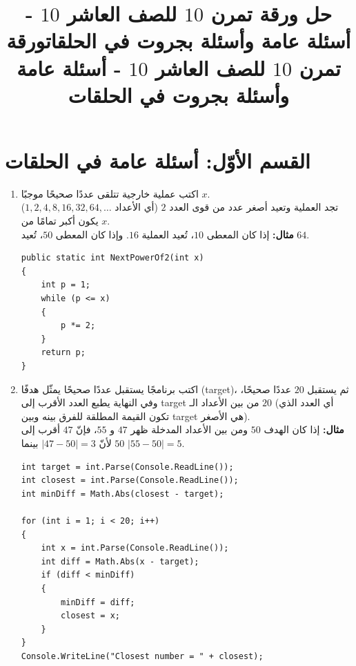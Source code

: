 \documentclass[14pt]{extarticle}
\title{حل ورقة تمرن $10$ للصف العاشر $10$ - أسئلة عامة وأسئلة بجروت في الحلقات}
\title{ورقة تمرن $10$ للصف العاشر $10$ - أسئلة عامة وأسئلة بجروت في الحلقات}
\begin{document}
\maketitle
\thispagestyle{fancy}

\section*{القسم الأوّل: أسئلة عامة في الحلقات}

\begin{enumerate}[itemsep=2em]

\item اكتب عملية خارجية تتلقى عددًا صحيحًا موجبًا $x$. \\
تجد العملية وتعيد أصغر عدد من قوى العدد $2$ (أي الأعداد $1, 2, 4, 8, 16, 32, 64, \dots$) يكون أكبر تمامًا من $x$. \\
\textbf{مثال:} إذا كان المعطى $10$، تُعيد العملية $16$. وإذا كان المعطى $50$، تُعيد $64$.
\ifwithsols
\begin{boxSolution}
\begin{english}
\begin{verbatim}
public static int NextPowerOf2(int x)
{
    int p = 1;
    while (p <= x)
    {
        p *= 2;
    }
    return p;
}
\end{verbatim}
\end{english}
\end{boxSolution}
\fi
\filbreak

\item اكتب برنامجًا يستقبل عددًا صحيحًا يمثّل هدفًا (\textenglish{target})، ثم يستقبل $20$ عددًا صحيحًا، وفي النهاية يطبع العدد الأقرب إلى \textenglish{target} من بين الأعداد الـ $20$ (أي العدد الذي تكون القيمة المطلقة للفرق بينه وبين \textenglish{target} هي الأصغر). \\
\textbf{مثال:} إذا كان الهدف $50$ ومن بين الأعداد المدخلة ظهر $47$ و $55$، فإنّ $47$ أقرب إلى $50$ لأنّ $|47 - 50| = 3$ بينما $|55 - 50| = 5$.
\ifwithsols
\begin{boxSolution}
\begin{english}
\begin{verbatim}
int target = int.Parse(Console.ReadLine());
int closest = int.Parse(Console.ReadLine());
int minDiff = Math.Abs(closest - target);

for (int i = 1; i < 20; i++)
{
    int x = int.Parse(Console.ReadLine());
    int diff = Math.Abs(x - target);
    if (diff < minDiff)
    {
        minDiff = diff;
        closest = x;
    }
}
Console.WriteLine("Closest number = " + closest);
\end{verbatim}
\end{english}
\end{boxSolution}
\fi
\filbreak


\end{enumerate}
\end{document}
